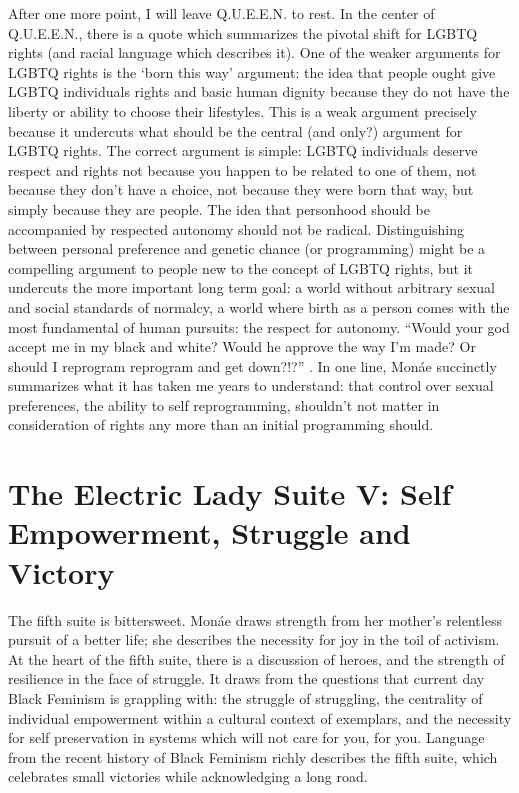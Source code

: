 \documentclass[a4paper, 11pt]{article} %
\begin{document}
After one more point, I will leave Q.U.E.E.N. to rest.
In the center of Q.U.E.E.N., there is a quote which summarizes the pivotal shift for LGBTQ rights (and racial language which describes it).
One of the weaker arguments for LGBTQ rights is the `born this way' argument: the idea that people ought give LGBTQ individuals rights and basic human dignity because they do not have the liberty or ability to choose their lifestyles.
This is a weak argument precisely because it undercuts what should be the central (and only?) argument for LGBTQ rights.
The correct argument is simple: LGBTQ individuals deserve respect and rights not because you happen to be related to one of them, not because they don't have a choice, not because they were born that way, but simply because they are people.
The idea that personhood should be accompanied by respected autonomy should not be radical.
Distinguishing between personal preference and genetic chance (or programming) might be a compelling argument to people new to the concept of LGBTQ rights, but it undercuts the more important long term goal: a world without arbitrary sexual and social standards of normalcy, a world where birth as a person comes with the most fundamental of human pursuits: the respect for autonomy. 
``Would your god accept me in my black and white? Would he approve the way I'm made? Or should I reprogram reprogram and get down?!?'' \cite{queen}.
In one line, Mon\'ae succinctly summarizes what it has taken me years to understand: that control over sexual preferences, the ability to self reprogramming, shouldn't not matter in consideration of rights any more than an initial programming should.



\section*{The Electric Lady Suite V: Self Empowerment, Struggle and Victory}

The fifth suite is bittersweet.
Mon\'ae draws strength from her mother's relentless pursuit of a better life; she describes the necessity for joy in the toil of activism.
At the heart of the fifth suite, there is a discussion of heroes, and the strength of resilience in the face of struggle.
It draws from the questions that current day Black Feminism is grappling with: the struggle of struggling, the centrality of individual empowerment within a cultural context of exemplars, and the necessity for self preservation in systems which will not care for you, for you.
Language from the recent history of Black Feminism richly describes the fifth suite, which celebrates small victories while acknowledging a long road.
\end{document}
